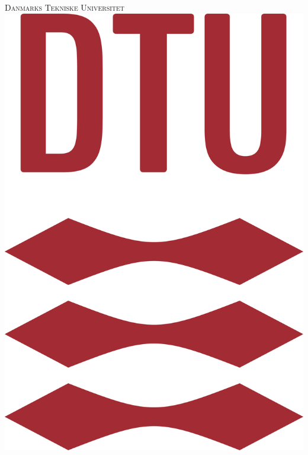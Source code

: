 \begin{titlepage} %
	\newcommand{\HRule}{\rule{\linewidth}{0.5mm}} %
	
	\center %
	   
	
	
	\textsc{\LARGE Danmarks Tekniske Universitet}\\[1.5cm] %
	
    \includegraphics[scale=0.15]{Billeder/DTULogo.png}\\
	

\end{titlepage}
